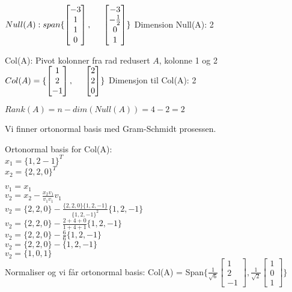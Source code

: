 \documentclass{article}
\begin{document}
$Null(A): span\{
\left [
\begin{matrix}
    -3\\
    1\\
    1\\
    0
\end{matrix}
\right ], \hspace{5 mm}
\left [
\begin{matrix}
    -3\\
    -\frac{1}{2}\\
    0\\
    1
\end{matrix}
\right ]
\}
$
Dimension Null(A): 2

Col(A): Pivot kolonner fra rad redusert $A$, kolonne 1 og 2\\
$Col(A) = \{ 
\left [
\begin{matrix}
    1\\
    2\\
    -1
\end{matrix}
\right ], \hspace{5 mm}
\left [
\begin{matrix}
    2\\
    2\\
    0
\end{matrix}
\right ] \}
$
Dimensjon til Col(A): 2

$Rank(A) = n-dim(Null(A)) = 4-2 = 2$

Vi finner ortonormal basis med Gram-Schmidt prosessen.

Ortonormal basis for Col(A):\\
$x_{1} = \{1,2-1\}^{T}$\\
$x_{2} = \{2,2,0\}^{T}$

$v_{1} = x_{1}$\\
$v_{2} = x_{2} - \frac{x_{2}v_{1}}{v_{1}v_{1}}v_{1}$\\
$v_{2} = \{2,2,0\} - \frac{ \{2,2,0\}\{1,2,-1\}}{\{1,2,-1\}^{2}}\{1,2,-1\}$\\
$v_{2} = \{2,2,0\} - \frac{ 2+4+0 }{ 1 + 4 + 1 }\{1,2,-1\}$\\
$v_{2} = \{2,2,0\} - \frac{ 6 }{ 6 }\{1,2,-1\}$\\
$v_{2} = \{2,2,0\} - \{1,2,-1\}$\\
$v_{2} = \{1,0,1\}$\\

Normaliser og vi får ortonormal basis:
Col(A) = Span$\{ \frac{1}{\sqrt{6}}
\left [
\begin{matrix}
    1\\
    2\\
    -1
\end{matrix}
\right ]
, \frac{1}{ \sqrt{2} }
\left [
\begin{matrix}
    1\\
    0\\
    1
\end{matrix}
\right ]
\}
$
\end{document}
